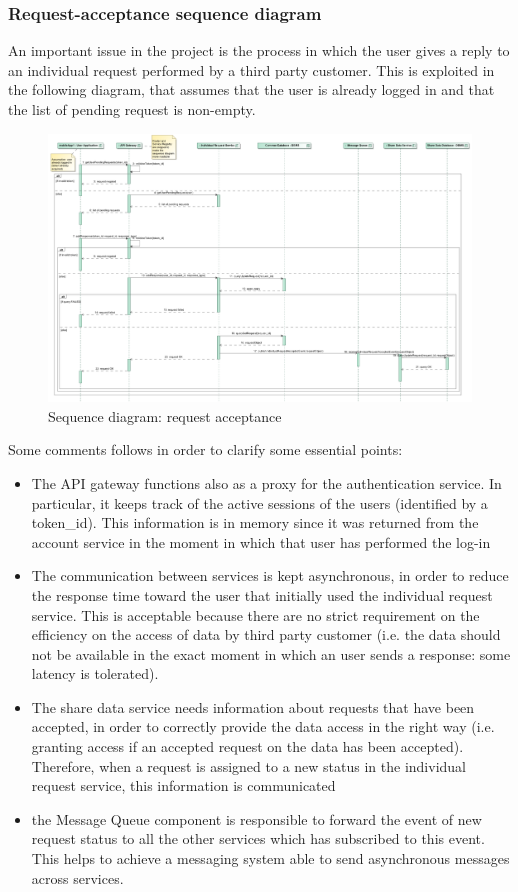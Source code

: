 \subsubsection{Request-acceptance sequence diagram}
An important issue in the project is the process in which the user gives a reply to an individual request
performed by a third party customer. 
This is exploited in the following diagram, that assumes that the user
is already logged in and that the list of pending request is non-empty.
\begin{figure}[H]
\includegraphics[width=\linewidth]{Images/requestacceptance.pdf}
\caption{ Sequence diagram: request acceptance }
\label{fig:requestacceptance}
\end{figure}

Some comments follows in order to clarify some essential points:
\begin{itemize}
\item The API gateway functions also as a proxy for the authentication service. In particular, it keeps track of the active sessions of the
users (identified by a token\_id). This information is in memory since
it was returned from the account service in the moment in which that user has performed the log-in
\item The communication between services is kept asynchronous, in order to reduce the response time 
toward the user that initially used the individual request service. This is acceptable because there are
no strict requirement on the efficiency on the access of data by third party customer (i.e. the data should
not be available in the exact moment in which an user sends a response: some latency is tolerated). 
\item The share data service needs information about requests that have been accepted, in order to correctly
provide the data access in the right way (i.e. granting access if an accepted request on the data has been 
accepted). Therefore, when a request is assigned to a new status in the individual request service, this information is communicated
\item the Message Queue component is responsible to forward the event of new request status to all the other services which has subscribed to this event. This helps to achieve a messaging system able to send asynchronous messages across services.
\end{itemize}


